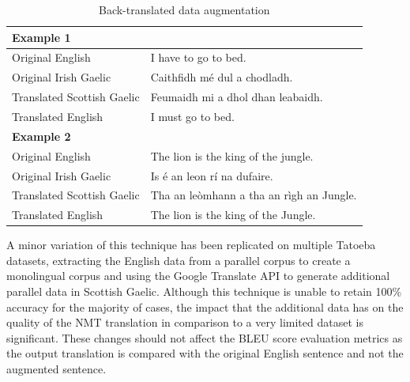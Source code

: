 \begin{table}[!ht]
\centering
\renewcommand{\arraystretch}{1.1}
\begin{tabular}{|l|l|}
\hline
\multicolumn{2}{|l|}{\textbf{Example 1}}                              \\ \hline
Original English           & I have to go to bed.                     \\ \hline
Original Irish Gaelic      & Caithfidh mé dul a chodladh.             \\ \hline
Translated Scottish Gaelic & Feumaidh mi a dhol dhan leabaidh.        \\ \hline
Translated English         & I must go to bed.                        \\ \hline
\multicolumn{2}{|l|}{\textbf{Example 2}}                              \\ \hline
Original English           & The lion is the king of the jungle.      \\ \hline
Original Irish Gaelic      & Is é an leon rí na dufaire.              \\ \hline
Translated Scottish Gaelic & Tha an leòmhann a tha an rìgh an Jungle. \\ \hline
Translated English         & The lion is the king of the Jungle.      \\ \hline
\end{tabular}
\captionsetup{justification=centering,font=Large}
\caption{Back-translated data augmentation}
\label{tab:back_translated-data}
\end{table}

A minor variation of this technique has been replicated on multiple Tatoeba datasets, extracting the English data from a parallel corpus to create a monolingual corpus and using the Google Translate API to generate additional parallel data in Scottish Gaelic. Although this technique is unable to retain 100\% accuracy for the majority of cases, the impact that the additional data has on the quality of the \acrshort{NMT} translation in comparison to a very limited dataset is significant. These changes should not affect the BLEU score evaluation metrics as the output translation is compared with the original English sentence and not the augmented sentence.


